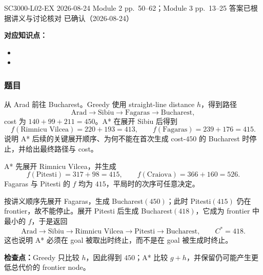 

\examplemeta
  {SC3000-L02-EX}
  {2026-08-24}
  {Module 2 pp.~50--62；Module 3 pp.~13--25}
  {答案已根据讲义与讨论核对}
  {已确认（2026-08-24）}


\textbf{对应知识点：}
\begin{itemize}
  \item {}
  \item {}
\end{itemize}

\subsubsection*{题目}

从 Arad 前往 Bucharest。Greedy 使用 straight-line distance $h$，得到路径
\[
  \text{Arad}\to\text{Sibiu}\to\text{Fagaras}\to\text{Bucharest},
\]
cost 为 $140+99+211=450$。A* 在展开 Sibiu 后得到
\[
  f(\text{Rimnicu Vilcea})=220+193=413,
  \qquad f(\text{Fagaras})=239+176=415.
\]
说明 A* 后续的关键展开顺序、为何不能在首次生成 cost-$450$ 的 Bucharest 时停止，并给出最终路径与 cost。

\begin{checkedsolution}
A* 先展开 Rimnicu Vilcea，并生成
\[
  f(\text{Pitesti})=317+98=415,
  \qquad f(\text{Craiova})=366+160=526.
\]
Fagaras 与 Pitesti 的 $f$ 均为 $415$，平局时的次序可任意决定。

按讲义顺序先展开 Fagaras，生成 Bucharest$(450)$；此时 Pitesti$(415)$ 仍在 frontier，故不能停止。展开 Pitesti 后生成 Bucharest$(418)$，它成为 frontier 中最小的 $f$，于是返回
\[
  \text{Arad}\to\text{Sibiu}\to\text{Rimnicu Vilcea}
  \to\text{Pitesti}\to\text{Bucharest},
  \qquad C^*=418.
\]
这也说明 A* 必须在 goal 被取出时终止，而不是在 goal 被生成时终止。
\end{checkedsolution}

\textbf{检查点：}Greedy 只比较 $h$，因此得到 $450$；A* 比较 $g+h$，并保留仍可能产生更低总代价的 frontier node。

\clearpage
{}

